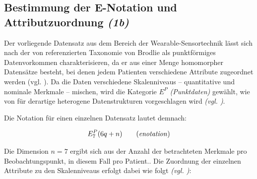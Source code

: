 
\subsection{Bestimmung der \acs{E-Notation} und Attributzuordnung \textit{(1b)}}
\label{sec:1b}

Der vorliegende Datensatz aus dem Bereich der Wearable-Sensortechnik lässt sich nach der von \citeauthor{1} referenzierten Taxonomie von Brodlie als punktförmiges Datenvorkommen charakterisieren, da er aus einer Menge homomorpher Datensätze besteht, bei denen jedem Patienten verschiedene Attribute zugeordnet werden (vgl. \cite[33, 36]{1}). Da die Daten verschiedene Skalenniveaus – quantitative und nominale Merkmale – mischen, wird die Kategorie \(E^{P}\) \textit{(Punktdaten)} gewählt, wie von \citeauthor{1} für derartige heterogene Datenstrukturen vorgeschlagen wird \textit{(\acs{vgl.} \cite[61, 63]{1})}.

Die Notation für einen einzelnen Datensatz lautet demnach:

\begin{equation}
E_{7}^{P}(6q + n) \tag{\textit{enotation}}
\label{eq:enotation}
\end{equation}

Die Dimension \(n = 7\) ergibt sich aus der Anzahl der betrachteten Merkmale pro Beobachtungspunkt, in diesem Fall pro Patient.. Die Zuordnung der einzelnen Attribute zu den Skalenniveaus erfolgt dabei wie folgt \textit{(\acs{vgl.} \cite[33, 39]{1})}:

